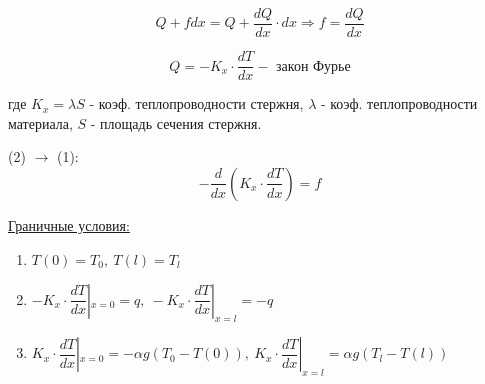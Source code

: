 \documentclass{bmstu}
\begin{document}
	\begin{center}
	\end{center}
	
	\begin{equation}
		Q+fdx=Q+\frac{dQ}{dx}\cdot dx \Rightarrow f=\frac{dQ}{dx}
	\end{equation}
	
	\begin{equation}
		Q= -K_x \cdot \frac{dT}{dx} - \text{ закон Фурье}
	\end{equation}
	
	где $K_x=\lambda S$ - коэф. теплопроводности стержня, $\lambda$ - коэф. теплопроводности материала, 	$S$ - площадь сечения стержня.
	
	(2) $\rightarrow$ (1):
	\begin{equation}
	-\frac{d}{dx}(K_x \cdot \frac{dT}{dx}) = f
	\end{equation}
	
	\underline{Граничные условия:}
	\begin{enumerate}
		\item $T(0)=T_0, \ T(l)=T_l$
		\item $-K_x \cdot \dfrac{dT}{dx} |_{x=0} = q, \ -K_x \cdot \dfrac{dT}{dx} |_{x=l} = -q$
		\item $K_x \cdot  \dfrac{dT}{dx} |_{x=0} = -\alpha g (T_0 - T(0)), \ K_x \cdot \dfrac{dT}{dx} |_{x=l} = \alpha g (T_l - T(l))$
	\end{enumerate}
	
\end{document}
